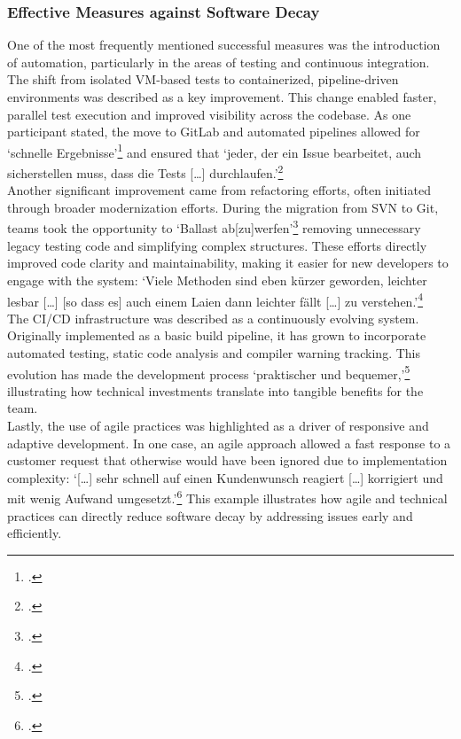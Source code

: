 \subsubsection{Effective Measures against Software Decay}
One of the most frequently mentioned successful measures was the introduction of automation, particularly in the areas of testing and continuous integration. The shift from isolated VM-based tests to containerized, pipeline-driven environments was described as a key improvement. This change enabled faster, parallel test execution
and improved visibility across the codebase. As one participant stated, the move to GitLab and automated pipelines allowed for `schnelle Ergebnisse'\footcite{Interview32025} and ensured that `jeder, der ein Issue bearbeitet, auch sicherstellen muss, dass die Tests [\ldots] durchlaufen.'\footcite{Interview32025}\\

Another significant improvement came from refactoring efforts, often initiated through broader modernization efforts. During the migration from SVN to Git, teams took the opportunity to `Ballast ab[zu]werfen'\footcite{Interview32025} removing unnecessary legacy testing code and simplifying complex structures. These efforts directly improved code clarity and maintainability,
making it easier for new developers to engage with the system: `Viele Methoden sind eben kürzer geworden, leichter lesbar [\ldots] [so dass es] auch einem Laien dann leichter fällt [\ldots] zu verstehen.'\footcite{Interview22025}\\

The CI/CD infrastructure was described as a continuously evolving system. Originally implemented as a basic build pipeline, it has grown to incorporate automated testing, static code analysis and compiler warning tracking. This evolution has made the development process `praktischer und bequemer,'\footcite{Interview22025} illustrating how technical
investments translate into tangible benefits for the team.\\

Lastly, the use of agile practices was highlighted as a driver of responsive and adaptive development. In one case, an agile approach allowed a fast response to a customer request that otherwise would have been ignored due to implementation complexity: `[\ldots] sehr schnell auf einen Kundenwunsch reagiert [\ldots] korrigiert und mit wenig Aufwand umgesetzt.'\footcite{Interview32025}
This example illustrates how agile and technical practices can directly reduce software decay by addressing issues early and efficiently.\\

